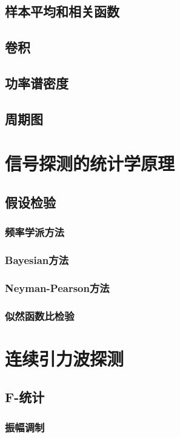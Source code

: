 \subsection{样本平均和相关函数}
\subsection{卷积}
\subsection{功率谱密度}
\subsection{周期图}

\section{信号探测的统计学原理}
\subsection{假设检验}
\subsubsection{频率学派方法}
\subsubsection{Bayesian方法}
\subsubsection{Neyman-Pearson方法}
\subsubsection{似然函数比检验}

\section{连续引力波探测}
\subsection{F-统计}
\subsubsection{振幅调制}
